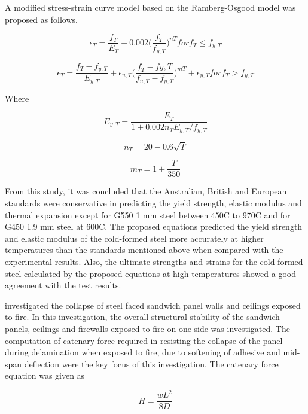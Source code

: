 A modified stress-strain curve model based on the Ramberg-Osgood model was proposed as follows.

\begin{equation}
\epsilon_T = \dfrac{f_T}{E_T}+0.002\big(\dfrac{f_T}{f_{y,T}}\big)^{nT} for f_T \leq f_{y,T}
\end{equation}

\begin{equation}
\epsilon_T = \dfrac{f_T-f_{y,T}}{E_{y,T}}+\epsilon_{u,T}\big(\dfrac{f_T-f{y,T}}{f_{u,T}-f_{y,T}}\big)^{mT} + \epsilon_{y,T} for f_T > f_{y,T}
\end{equation}

Where

\begin{equation}
E_{y,T} = \dfrac{E_T}{1+0.002n_TE_{y,T}/f_{y,T}}
\end{equation}

\begin{equation}
n_T = 20-0.6\sqrt{T}
\end{equation}

\begin{equation}
m_T = 1+\dfrac{T}{350}
\end{equation}


From this study, it was concluded that the Australian, British and European standards were conservative in predicting the yield strength, elastic modulus and thermal expansion except for G550 1 mm steel between 450\degree C to 970\degree C and for G450 1.9 mm steel at 600\degree C. The proposed equations predicted the yield strength and elastic modulus of the cold-formed steel more accurately at higher temperatures than the standards mentioned above when compared with the experimental results. Also, the ultimate strengths and strains for the cold-formed steel calculated by the proposed equations at high temperatures showed a good agreement with the test results.

\citet{Cooke2008} investigated the collapse of steel faced sandwich panel walls and ceilings exposed to fire. In this investigation, the overall structural stability of the sandwich panels, ceilings and firewalls exposed to fire on one side was investigated. The computation of catenary force required in resisting the collapse of the panel during delamination when exposed to fire, due to softening of adhesive and mid-span deflection were the key focus of this investigation. The catenary force equation was given as 

\begin{equation}
H = \dfrac{wL^{2}}{8D}
\end{equation}

